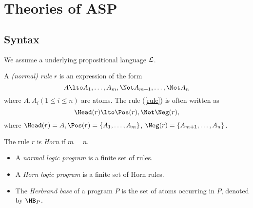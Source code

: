 \section{Theories of ASP}
\subsection{Syntax}
\begin{frame}[t]
We assume a underlying propositional language $\cal L$.

A {\em (normal) rule} $r$ is an expression of the form
\begin{equation}\label{rule}
  A\lto A_1,\ldots, A_m,\Not A_{m+1},\ldots, \Not A_n
\end{equation}
where $A,A_i(1\leq i\leq n)$ are atoms. The rule (\ref{rule}) is often written as
\begin{equation}\label{rule:set}
  \Head(r)\lto \Pos(r),\Not\Neg(r),
\end{equation}
where $\Head(r)=A, \Pos(r)=\{A_1,\ldots,A_m\}$, $\Neg(r) = \{A_{m+1},\ldots, A_n\}$.

The rule $r$ is {\em Horn} if $m=n$.

\begin{itemize}
  \item A {\em normal logic program} is a finite set of rules.

  \item A {\em Horn logic program} is a  finite set of Horn rules.

  \item The {\em Herbrand base} of a program $P$ is the set of atoms occurring in $P$, denoted by $\HB_P$.
\end{itemize}
\end{frame}

